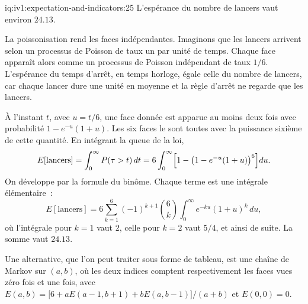 \begin{solution}{iq:iv1:expectation-and-indicators:25}
L'espérance du nombre de lancers vaut environ $24.13$.

La poissonisation rend les faces indépendantes. Imaginons que les lancers arrivent selon un processus de Poisson de taux un par unité de temps. Chaque face apparaît alors comme un processus de Poisson indépendant de taux $1/6$. L'espérance du temps d'arrêt, en temps horloge, égale celle du nombre de lancers, car chaque lancer dure une unité en moyenne et la règle d'arrêt ne regarde que les lancers.

À l'instant $t$, avec $u = t/6$, une face donnée est apparue au moins deux fois avec probabilité $1 - e^{-u}(1 + u)$. Les six faces le sont toutes avec la puissance sixième de cette quantité. En intégrant la queue de la loi,
\[
E[\text{lancers}] = \int_0^\infty P(\tau > t)\,dt = 6 \int_0^\infty \Bigl[1 - \bigl(1 - e^{-u}(1 + u)\bigr)^6\Bigr] du.
\]
On développe par la formule du binôme. Chaque terme est une intégrale élémentaire~:
\[
E[\text{lancers}] = 6 \sum_{k=1}^{6} (-1)^{k+1} \binom{6}{k} \int_0^\infty e^{-ku}(1 + u)^k\,du,
\]
où l'intégrale pour $k = 1$ vaut $2$, celle pour $k = 2$ vaut $5/4$, et ainsi de suite. La somme vaut $24.13$.

Une alternative, que l'on peut traiter sous forme de tableau, est une chaîne de Markov sur $(a, b)$, où les deux indices comptent respectivement les faces vues zéro fois et une fois, avec $E(a,b) = \bigl[6 + a E(a-1, b+1) + b E(a, b-1)\bigr]/(a+b)$ et $E(0,0)=0$.

\end{solution}
